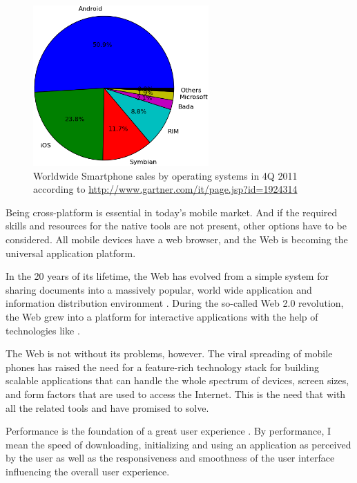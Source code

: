 \begin{figure}[h!]
  \begin{center}
    \includegraphics[width=0.6\textwidth]{images/market-share.png}
    \caption{Worldwide Smartphone sales by operating systems in 4Q
      2011 according to
      \url{http://www.gartner.com/it/page.jsp?id=1924314}}
    \label{figure:market-share.png}
  \end{center}
\end{figure}

Being cross-platform is essential in today's mobile market. And if the
required skills and resources for the native tools are not present,
other options have to be considered. All mobile devices have a web
browser, and the Web is becoming the universal application
platform. \cite{taivalsaari2011web, mikkonen2011apps}

In the 20 years of its lifetime, the Web has evolved from a simple
system for sharing documents into a massively popular, world wide
application and information distribution environment
\cite{taivalsaari2011web}. During the so-called Web 2.0 revolution,
the Web grew into a platform for interactive applications with the
help of technologies like  \cite{garrett2005ajax}.

The Web is not without its problems, however. The viral spreading of
mobile phones has raised the need for a feature-rich technology stack
for building scalable applications that can handle the whole spectrum
of devices, screen sizes, and form factors that are used to access the
Internet. This is the need that  with all the related
tools and  have promised to solve.

Performance is the foundation of a great user experience
\cite{charland2011mobile}. By performance, I mean the speed of
downloading, initializing and using an application as perceived by the
user as well as the responsiveness and smoothness of the user
interface influencing the overall user experience.


